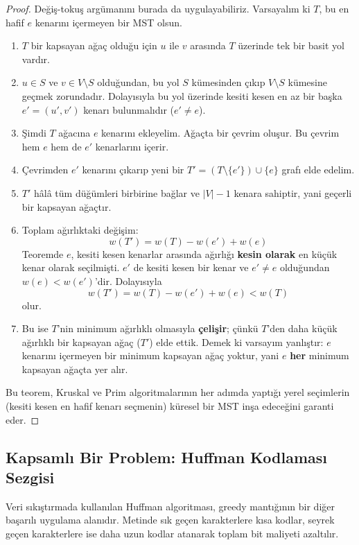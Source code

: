 \begin{proof}
Değiş-tokuş argümanını burada da uygulayabiliriz.
Varsayalım ki $T$, bu en hafif $e$ kenarını içermeyen bir MST olsun.
\begin{enumerate}
    \item $T$ bir kapsayan ağaç olduğu için $u$ ile $v$ arasında $T$ üzerinde tek bir basit yol vardır.
    \item $u \in S$ ve $v \in V \setminus S$ olduğundan, bu yol $S$ kümesinden çıkıp $V \setminus S$ kümesine geçmek zorundadır. Dolayısıyla bu yol üzerinde kesiti kesen en az bir başka $e' = (u', v')$ kenarı bulunmalıdır ($e' \ne e$).
    \item Şimdi $T$ ağacına $e$ kenarını ekleyelim. Ağaçta bir çevrim oluşur. Bu çevrim hem $e$ hem de $e'$ kenarlarını içerir.
\item Çevrimden $e'$ kenarını çıkarıp yeni bir $T' = (T \setminus \{e'\}) \cup \{e\}$ grafı elde edelim.
    \item $T'$ hâlâ tüm düğümleri birbirine bağlar ve $|V|-1$ kenara sahiptir, yani geçerli bir kapsayan ağaçtır.
    \item Toplam ağırlıktaki değişim:
    \[
    w(T') = w(T) - w(e') + w(e)
    \]
    Teoremde $e$, kesiti kesen kenarlar arasında ağırlığı \textbf{kesin olarak} en küçük kenar olarak seçilmişti. $e'$ de kesiti kesen bir kenar ve $e' \ne e$ olduğundan $w(e) < w(e')$'dir. Dolayısıyla
    \[
    w(T') = w(T) - w(e') + w(e) < w(T)
    \]
    olur.
    \item Bu ise $T$'nin minimum ağırlıklı olmasıyla \textbf{çelişir}; çünkü $T$'den daha küçük ağırlıklı bir kapsayan ağaç ($T'$) elde ettik. Demek ki varsayım yanlıştır: $e$ kenarını içermeyen bir minimum kapsayan ağaç yoktur, yani $e$ \textbf{her} minimum kapsayan ağaçta yer alır.
\end{enumerate}
Bu teorem, Kruskal ve Prim algoritmalarının her adımda yaptığı yerel seçimlerin (kesiti kesen en hafif kenarı seçmenin) küresel bir MST inşa edeceğini garanti eder.
\end{proof}

\subsection{Kapsamlı Bir Problem: Huffman Kodlaması Sezgisi}

Veri sıkıştırmada kullanılan Huffman algoritması, greedy mantığının bir diğer başarılı uygulama alanıdır. Metinde sık geçen karakterlere kısa kodlar, seyrek geçen karakterlere ise daha uzun kodlar atanarak toplam bit maliyeti azaltılır.


